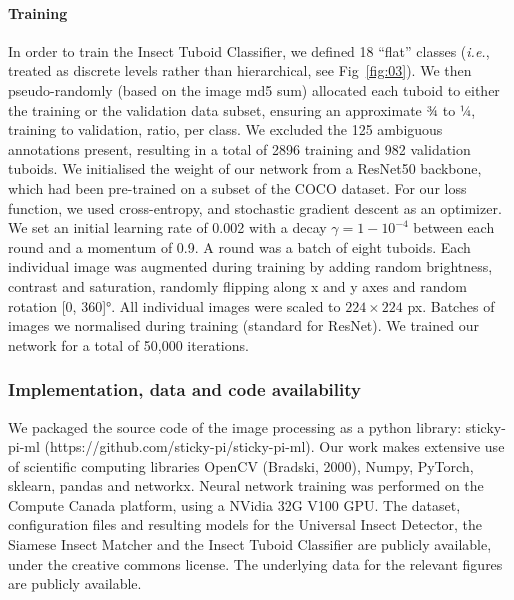 \documentclass[12pt]{article}
\begin{document}
\begin{linenumbers}
		\paragraph{Training}
		In order to train the Insect Tuboid Classifier, we defined 18 “flat” classes (\emph{i.e.}, treated as discrete levels rather than hierarchical, see Fig~\ref{fig:03}). We then pseudo-randomly (based on the image md5 sum) allocated each tuboid to either the training or the validation data subset, ensuring an approximate ¾ to ¼, training to validation, ratio, per class. We excluded the 125 ambiguous annotations present, resulting in a total of 2896 training and 982 validation tuboids. 
		We initialised the weight of our network from a ResNet50 backbone, which had been pre-trained on a subset of the COCO dataset. For our loss function, we used cross-entropy, and stochastic gradient descent as an optimizer. We set an initial learning rate of 0.002 with a decay $\gamma = 1- 10^{-4}$ between each round and a momentum of 0.9. A round was a batch of eight tuboids. Each individual image was augmented during training by adding random brightness, contrast and saturation, randomly flipping along x and y axes and random rotation [0, 360]°. All individual images were scaled to $224 \times{} 224$ px. Batches of images we normalised during training (standard for ResNet). We trained our network for a total of 50,000 iterations.
		
		\subsubsection*{Implementation, data and code availability}
		We packaged the source code of the image processing as a python library: sticky-pi-ml (https://github.com/sticky-pi/sticky-pi-ml). Our work makes extensive use of scientific computing libraries OpenCV (Bradski, 2000), Numpy\cite{harris_array_2020}, PyTorch\cite{paszke_pytorch_2019}, sklearn\cite{pedregosa_scikit-learn_2011}, pandas\cite{the_pandas_development_team_pandas-devpandas_2020} and networkx\cite{hagberg_exploring_2008}. Neural network training was performed on the Compute Canada platform, using a NVidia 32G V100 GPU. The dataset, configuration files and resulting models for the Universal Insect Detector, the Siamese Insect Matcher and the Insect Tuboid Classifier are publicly available, under the creative commons license\cite{geissmann_sticky_2022}. 
		The underlying data for the relevant figures are publicly available\cite{noauthor_datasets_2022}.
		
		

\end{linenumbers}
\end{document}
